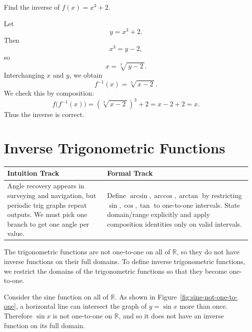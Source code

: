 \begin{example}
Find the inverse of
\(
f(x)=x^3+2.
\)
\end{example}

\begin{solution}
Let
\[
y=x^3+2.
\]
Then
\[
x^3=y-2,
\]
so
\[
x=\sqrt[3]{\,y-2\,}.
\]
Interchanging \(x\) and \(y\), we obtain
\[
f^{-1}(x)=\sqrt[3]{\,x-2\,}.
\]
We check this by composition:
\[
f\bigl(f^{-1}(x)\bigr)
=
\left(\sqrt[3]{\,x-2\,}\right)^3+2
=
x-2+2
=
x.
\]
Thus the inverse is correct.
\end{solution}


\section{Inverse Trigonometric Functions}

\begin{center}
\renewcommand{\arraystretch}{1.2}
\begin{tabular}{|p{}|p{}|}
\hline
\textbf{Intuition Track} & \textbf{Formal Track} \\
\hline
Angle recovery appears in surveying and navigation, but periodic trig graphs repeat outputs. We must pick one branch to get one angle per value. & Define \(\arcsin,\arccos,\arctan\) by restricting \(\sin,\cos,\tan\) to one-to-one intervals. State domain/range explicitly and apply composition identities only on valid intervals. \\
\hline
\end{tabular}
\end{center}

The trigonometric functions are not one-to-one on all of \(\mathbb{R}\), so they do not have inverse functions on their full domains. To define inverse trigonometric functions, we restrict the domains of the trigonometric functions so that they become one-to-one.

Consider the sine function on all of \(\mathbb{R}\). As shown in Figure~\ref{fig:sine-not-one-to-one}, a horizontal line can intersect the graph of \(y=\sin x\) more than once. Therefore \(\sin x\) is not one-to-one on \(\mathbb{R}\), and so it does not have an inverse function on its full domain.

